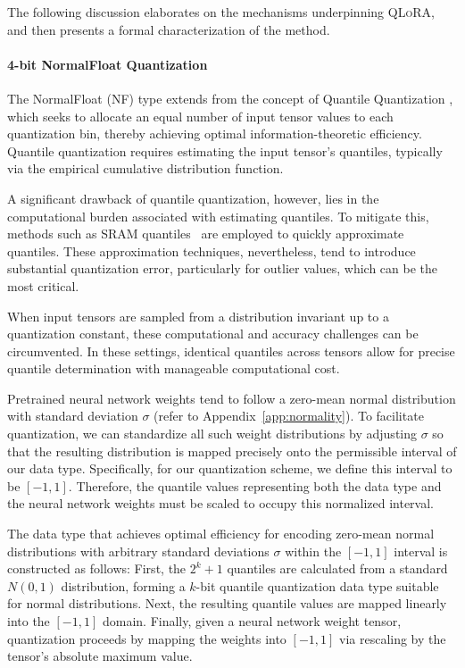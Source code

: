 The following discussion elaborates on the mechanisms underpinning \textsc{QLoRA}, and then presents a formal characterization of the method.

\paragraph{4-bit NormalFloat Quantization} The NormalFloat (NF) type extends from the concept of Quantile Quantization \citep{dettmers2022optimizers}, which seeks to allocate an equal number of input tensor values to each quantization bin, thereby achieving optimal information-theoretic efficiency. Quantile quantization requires estimating the input tensor’s quantiles, typically via the empirical cumulative distribution function.

A significant drawback of quantile quantization, however, lies in the computational burden associated with estimating quantiles. To mitigate this, methods such as SRAM quantiles~\citep{dettmers2022optimizers} are employed to quickly approximate quantiles. These approximation techniques, nevertheless, tend to introduce substantial quantization error, particularly for outlier values, which can be the most critical.

When input tensors are sampled from a distribution invariant up to a quantization constant, these computational and accuracy challenges can be circumvented. In these settings, identical quantiles across tensors allow for precise quantile determination with manageable computational cost.

Pretrained neural network weights tend to follow a zero-mean normal distribution with standard deviation $\sigma$ (refer to Appendix~\ref{app:normality}). To facilitate quantization, we can standardize all such weight distributions by adjusting $\sigma$ so that the resulting distribution is mapped precisely onto the permissible interval of our data type. Specifically, for our quantization scheme, we define this interval to be $[-1, 1]$. Therefore, the quantile values representing both the data type and the neural network weights must be scaled to occupy this normalized interval.

The data type that achieves optimal efficiency for encoding zero-mean normal distributions with arbitrary standard deviations $\sigma$ within the $[-1, 1]$ interval is constructed as follows: First, the $2^k+1$ quantiles are calculated from a standard $N(0, 1)$ distribution, forming a $k$-bit quantile quantization data type suitable for normal distributions. Next, the resulting quantile values are mapped linearly into the $[-1, 1]$ domain. Finally, given a neural network weight tensor, quantization proceeds by mapping the weights into $[-1, 1]$ via rescaling by the tensor’s absolute maximum value.

